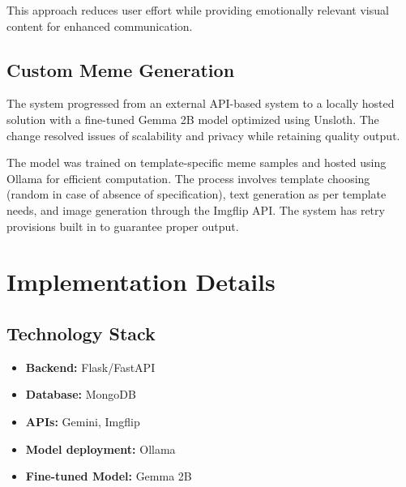\documentclass[conference]{IEEEtran}
\begin{document}
This approach reduces user effort while providing emotionally relevant visual content for enhanced communication.

\subsection{Custom Meme Generation}
The system progressed from an external API-based system to a locally hosted solution with a fine-tuned Gemma 2B model optimized using Unsloth. The change resolved issues of scalability and privacy while retaining quality output.

The model was trained on template-specific meme samples and hosted using Ollama for efficient computation. The process involves template choosing (random in case of absence of specification), text generation as per template needs, and image generation through the Imgflip API. The system has retry provisions built in to guarantee proper output.

% 

\section{Implementation Details}

\subsection{Technology Stack}
\begin{itemize}
    \item \textbf{Backend:} Flask/FastAPI
    \item \textbf{Database:} MongoDB
    \item \textbf{APIs:} Gemini, Imgflip
    \item \textbf{Model deployment:} Ollama
    \item \textbf{Fine-tuned Model:} Gemma 2B
\end{itemize}

\end{document}

